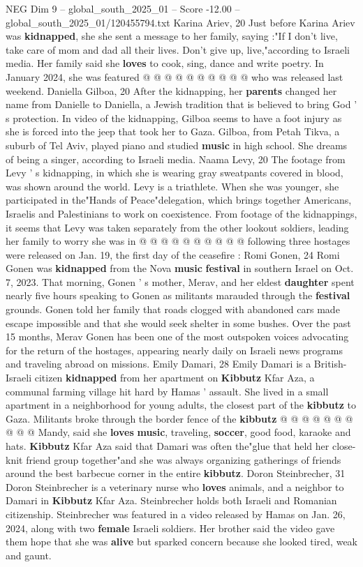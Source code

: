 \begin{textsample}{NEG Dim 9 – global\_south\_2025\_01 – Score -12.00 – global\_south\_2025\_01/120455794.txt}
Karina Ariev, 20 Just before Karina Ariev was \textbf{kidnapped}, she she sent a message to her family, saying :"If I don't live, take care of mom and dad all their lives.
Don't give up, live,"according to Israeli media.
Her family said she \textbf{loves} to cook, sing, dance and write poetry.
In January 2024, she was featured @ @ @ @ @ @ @ @ @ @ who was released last weekend.
Daniella Gilboa, 20 After the kidnapping, her \textbf{parents} changed her name from Danielle to Daniella, a Jewish tradition that is believed to bring God ' s protection.
In video of the kidnapping, Gilboa seems to have a foot injury as she is forced into the jeep that took her to Gaza.
Gilboa, from Petah Tikva, a suburb of Tel Aviv, played piano and studied \textbf{music} in high school.
She dreams of being a singer, according to Israeli media.
Naama Levy, 20 The footage from Levy ' s kidnapping, in which she is wearing gray sweatpants covered in blood, was shown around the world.
Levy is a triathlete.
When she was younger, she participated in the"Hands of Peace"delegation, which brings together Americans, Israelis and Palestinians to work on coexistence.
From footage of the kidnappings, it seems that Levy was taken separately from the other lookout soldiers, leading her family to worry she was in @ @ @ @ @ @ @ @ @ @ following three hostages were released on Jan. 19, the first day of the ceasefire : Romi Gonen, 24 Romi Gonen was \textbf{kidnapped} from the Nova \textbf{music} \textbf{festival} in southern Israel on Oct. 7, 2023.
That morning, Gonen ' s mother, Merav, and her eldest \textbf{daughter} spent nearly five hours speaking to Gonen as militants marauded through the \textbf{festival} grounds.
Gonen told her family that roads clogged with abandoned cars made escape impossible and that she would seek shelter in some bushes.
Over the past 15 months, Merav Gonen has been one of the most outspoken voices advocating for the return of the hostages, appearing nearly daily on Israeli news programs and traveling abroad on missions.
Emily Damari, 28 Emily Damari is a British-Israeli citizen \textbf{kidnapped} from her apartment on \textbf{Kibbutz} Kfar Aza, a communal farming village hit hard by Hamas ' assault.
She lived in a small apartment in a neighborhood for young adults, the closest part of the \textbf{kibbutz} to Gaza.
Militants broke through the border fence of the \textbf{kibbutz} @ @ @ @ @ @ @ @ @ @ Mandy, said she \textbf{loves} \textbf{music}, traveling, \textbf{soccer}, good food, karaoke and hats. \textbf{Kibbutz} Kfar Aza said that Damari was often the"glue that held her close-knit friend group together"and she was always organizing gatherings of friends around the best barbecue corner in the entire \textbf{kibbutz}.
Doron Steinbrecher, 31 Doron Steinbrecher is a veterinary nurse who \textbf{loves} animals, and a neighbor to Damari in \textbf{Kibbutz} Kfar Aza.
Steinbrecher holds both Israeli and Romanian citizenship.
Steinbrecher was featured in a video released by Hamas on Jan. 26, 2024, along with two \textbf{female} Israeli soldiers.
Her brother said the video gave them hope that she was \textbf{alive} but sparked concern because she looked tired, weak and gaunt.


\end{textsample}
